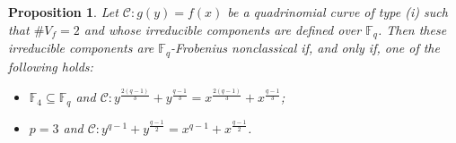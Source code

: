 \documentclass[preprint,12pt]{elsarticle}
\newtheorem{proposition}[theorem]{Proposition}
\begin{document}
\begin{proposition}
    Let $\mathcal{C} \colon g(y) = f(x)$ be a quadrinomial curve of type (i) such that $\# V_f = 2$ and whose irreducible components are defined over $\mathbb{F}_q$. Then these irreducible components are $\mathbb{F}_q$-Frobenius nonclassical if, and only if, one of the following holds:

    \begin{itemize}
        \item[(i)]  $\mathbb{F}_4 \subseteq \mathbb{F}_q$ and $\mathcal{C}: y^{\frac{2(q-1)}{3}} + y^{\frac{q-1}{3}} = x^{\frac{2(q-1)}{3}} + x^{\frac{q-1}{3}}$;
        \item[(ii)] $p = 3$ and $\mathcal{C}: y^{q-1} + y^{\frac{q-1}{2}} = x^{q-1} + x^{\frac{q-1}{2}}$.
    \end{itemize}
\end{proposition}
\end{document}
